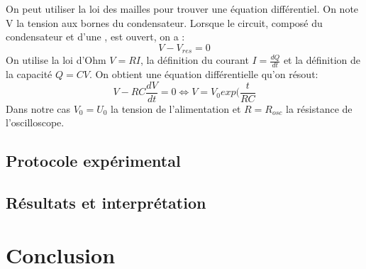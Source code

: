 \documentclass[12pt]{article}
\begin{document}
On peut utiliser la loi des mailles pour trouver une équation différentiel. On note V la tension aux bornes du condensateur. Lorsque le circuit, composé du condensateur et d'une , est ouvert, on a :
\begin{equation}
V-V_{res}=0
\end{equation}
On utilise la loi d'Ohm $V=RI$, la définition du courant $I=\frac{dQ}{dt}$ et la définition de la capacité $Q=CV$. On obtient une équation différentielle qu'on résout:
\begin{equation}
V-RC\frac{dV}{dt}=0 \Longleftrightarrow V=V_0exp(\frac{t}{RC}
\end{equation}
Dans notre cas $V_0=U_0$ la tension de l'alimentation et $R=R_{osc}$ la résistance de l'oscilloscope.
	
	\subsection{Protocole expérimental}
	
	\subsection{Résultats et interprétation}
	
\section*{Conclusion}	
\end{document}
